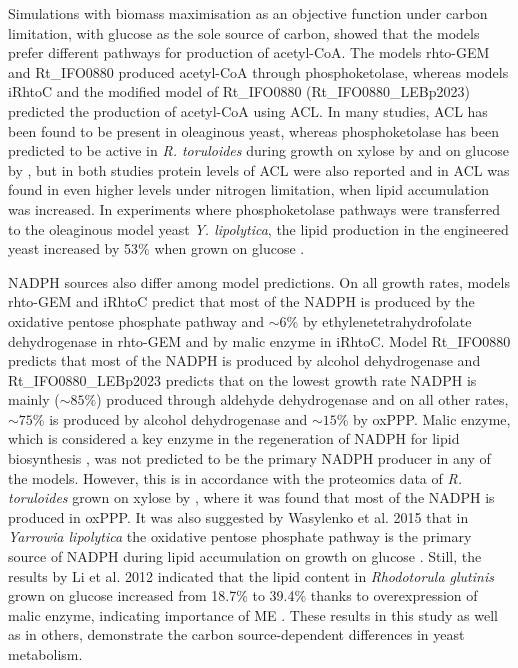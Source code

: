 Simulations with biomass maximisation as an objective function under carbon limitation, with glucose as the sole source of carbon, showed that the models prefer different pathways for 
production of acetyl-CoA. The models rhto-GEM and Rt\_IFO0880 produced acetyl-CoA through phosphoketolase, whereas models iRhtoC and the modified model 
of Rt\_IFO0880 (Rt\_IFO0880\_LEBp2023) predicted the production of acetyl-CoA using ACL. In many studies, ACL has been found to be present in oleaginous yeast, whereas phosphoketolase has been predicted to be active in \textit{R. toruloides} during growth on xylose by \cite{Pinheiro2020, Rekena2023} and on glucose by \cite{Rekena2023}, but in both studies protein levels of ACL were also reported and in \cite{Pinheiro2020} ACL was found in even higher levels under nitrogen limitation, when lipid accumulation was increased.  %
In experiments where phosphoketolase pathways were transferred to the oleaginous model yeast \textit{Y. lipolytica}, the lipid production in the engineered yeast increased by 53\% when grown on glucose \cite{Xu2016}.

NADPH sources also differ among model predictions. On all growth rates, models rhto-GEM and iRhtoC predict that most of the NADPH is produced by the oxidative pentose phosphate pathway and $\sim 6\%$ by ethylenetetrahydrofolate dehydrogenase in rhto-GEM and by malic enzyme in iRhtoC. Model Rt\_IFO0880 predicts that most of the NADPH is produced by alcohol dehydrogenase and Rt\_IFO0880\_LEBp2023 predicts that on the lowest growth rate NADPH is mainly ($\sim 85\%$) produced through aldehyde dehydrogenase and on all other rates, $\sim 75\%$ is produced by alcohol dehydrogenase and $\sim 15\%$ by oxPPP. Malic enzyme, which is considered a key enzyme in the regeneration of NADPH for lipid biosynthesis \cite{Ratledge2002}, was not predicted to be the primary NADPH producer in any of the models. However, this is in accordance with the proteomics data of \textit{R. toruloides} grown on xylose by \cite{Pinheiro2020}, where it was found that most of the NADPH is produced in oxPPP. It was also suggested by Wasylenko et al. 2015 that in \textit{Yarrowia lipolytica} the oxidative pentose phosphate pathway is the primary source of NADPH during lipid accumulation on growth on glucose \cite{Wasylenko2015}. Still, the results by Li et al. 2012 indicated that the lipid content in \textit{Rhodotorula glutinis} grown on glucose increased from 18.7\% to 39.4\% thanks to overexpression of malic enzyme, indicating importance of ME \cite{Li2012}. These results in this study as well as in others, demonstrate the carbon source-dependent differences in yeast metabolism.

